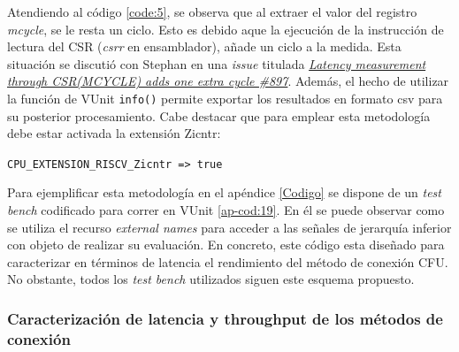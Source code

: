 Atendiendo al código \ref{code:5}, se observa que al extraer el valor del registro \textit{mcycle}, se le resta un ciclo.
Esto es debido aque la ejecución de la instrucción de lectura del CSR (\textit{csrr} en ensamblador), añade un ciclo a la medida.
Esta situación se discutió con Stephan en una \textit{issue} titulada \href{https://github.com/stnolting/neorv32/issues/897}{\textit{Latency measurement through CSR(MCYCLE) adds one extra cycle \#897}}.
Además, el hecho de utilizar la función de VUnit \texttt{info()} permite exportar los resultados en formato csv para su posterior procesamiento.
Cabe destacar que para emplear esta metodología debe estar activada la extensión Zicntr:

\hspace{32mm} \texttt{CPU_EXTENSION_RISCV_Zicntr => true} 

Para ejemplificar esta metodología en el apéndice \ref{Codigo} se dispone de un \textit{test bench} codificado para correr en VUnit \ref{ap-cod:19}.
En él se puede observar como se utiliza el recurso \textit{external names} para acceder a las señales de jerarquía inferior con objeto de realizar su evaluación.
En concreto, este código esta diseñado para caracterizar en términos de latencia el rendimiento del método de conexión CFU.
No obstante, todos los \textit{test bench} utilizados siguen este esquema propuesto.

%
%

\subsubsection{Caracterización de latencia y throughput de los métodos de conexión}

